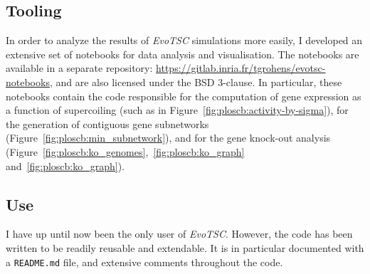\subsection{Tooling}

In order to analyze the results of  \emph{EvoTSC} simulations more easily, I developed an extensive set of notebooks for data analysis and visualisation.
The notebooks are available in a separate repository: \url{https://gitlab.inria.fr/tgrohens/evotsc-notebooks}, and are also licensed under the BSD 3-clause.
In particular, these notebooks contain the code responsible for the computation of gene expression as a function of supercoiling (such as in Figure~\ref{fig:ploscb:activity-by-sigma}), for the generation of contiguous gene subnetworks (Figure~\ref{fig:ploscb:min_subnetwork}), and for the gene knock-out analysis (Figure~\ref{fig:ploscb:ko_genomes},~\ref{fig:ploscb:ko_graph} and~\ref{fig:ploscb:ko_graph}).

\subsection{Use}

I have up until now been the only user of \emph{EvoTSC}.
However, the code has been written to be readily reusable and extendable.
It is in particular documented with a \texttt{README.md} file, and extensive comments throughout the code.
